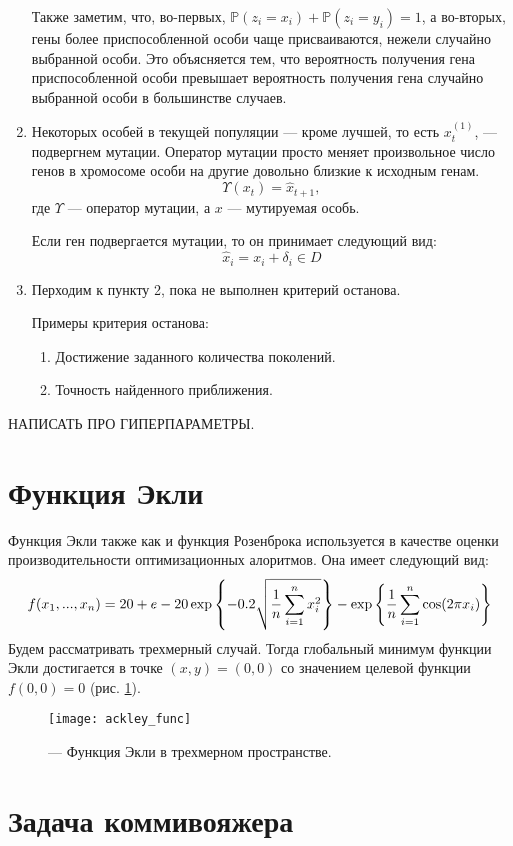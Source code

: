\begin{enumerate}
Также заметим, что, во-первых, $\mathbb{P}(z_i = x_i) + \mathbb{P}(z_i = y_i) = 1$, а во-вторых, гены более приспособленной особи чаще присваиваются, нежели случайно выбранной особи. Это объясняется тем, что вероятность получения гена приспособленной особи превышает вероятность  получения гена случайно выбранной особи в большинстве случаев.

\item Некоторых особей в текущей популяции  --- кроме лучшей, то есть $x_t^{(1)}$, --- подвергнем мутации. Оператор мутации просто меняет произвольное число генов в хромосоме особи на другие довольно близкие к исходным генам.
\[
	\Upsilon(x_t) = \hat{x}_{t+1},
\]
где $\Upsilon$ --- оператор мутации, а $x$ --- мутируемая особь.

Если ген подвергается мутации, то он принимает следующий вид:
\[
\hat{x}_i
= x_i + \delta_i \in D
\]
	\item Перходим к пункту 2, пока не выполнен критерий останова.

	Примеры критерия останова:
	\begin{enumerate}
		\item Достижение заданного количества поколений.
		\item Точность найденного приближения.
	\end{enumerate}
\end{enumerate}

НАПИСАТЬ ПРО ГИПЕРПАРАМЕТРЫ.

\section{Функция Экли}
\noindent
Функция Экли также как и функция Розенброка используется в качестве оценки производительности оптимизационных алоритмов. Она имеет следующий вид:
 \[
 	f(x_1, ..., x_n)
	=
	20
	+
	e
	-20\exp\left\{-0.2
	\sqrt{\dfrac{1}{n}
	\sum_{i=1}^n \limits x^2_i}
	\right\}
	-
	\exp\left\{
	\dfrac{1}{n}
	\sum_{i=1}^n \limits
	\cos(2\pi x_i)
	\right\}
 \]
 Будем рассматривать трехмерный случай. Тогда глобальный минимум функции Экли достигается в точке $(x, y) = (0, 0)$ со значением целевой функции $f(0, 0) = 0$ (рис. \ref{img:ackley_func}).

 \begin{figure}[h!]
 	\centering
   \texttt{[image: ackley\_func]}
   \caption{ --- Функция Экли в трехмерном пространстве.}
   \label{img:ackley_func}
 \end{figure}

\section{Задача коммивояжера}
